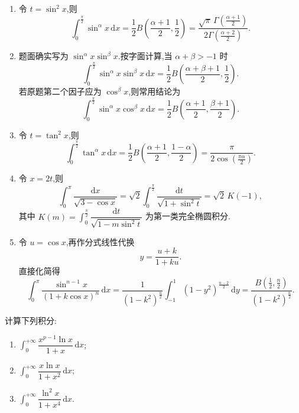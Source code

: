 \begin{solution}
    \begin{enumerate}
        \item 令 $t=\sin^2x$,则
              \[
                  \int_0^{\frac{\pi}{2}}\sin^\alpha x\,\mathrm{d}x
                  =\dfrac{1}{2}B\left(\dfrac{\alpha+1}{2},\dfrac{1}{2}\right)
                  =\dfrac{\sqrt\pi\,\Gamma\left(\frac{\alpha+1}{2}\right)}
                  {2\Gamma\left(\frac{\alpha+2}{2}\right)}.
              \]
        \item 题面确实写为 $\sin^\alpha x\sin^\beta x$.按字面计算,当 $\alpha+\beta>-1$ 时
              \[
                  \int_0^{\frac{\pi}{2}}\sin^\alpha x\sin^\beta x\,\mathrm{d}x
                  =\dfrac{1}{2}B\left(\dfrac{\alpha+\beta+1}{2},\dfrac{1}{2}\right).
              \]
              若原题第二个因子应为 $\cos^\beta x$,则常用结论为
              \[
                  \int_0^{\frac{\pi}{2}}\sin^\alpha x\cos^\beta x\,\mathrm{d}x
                  =\dfrac{1}{2}B\left(\dfrac{\alpha+1}{2},\dfrac{\beta+1}{2}\right).
              \]
        \item 令 $t=\tan^2x$,则
              \[
                  \int_0^{\frac{\pi}{2}}\tan^\alpha x\,\mathrm{d}x
                  =\dfrac{1}{2}B\left(\dfrac{\alpha+1}{2},\dfrac{1-\alpha}{2}\right)
                  =\dfrac{\pi}{2\cos\left(\frac{\pi\alpha}{2}\right)}.
              \]
        \item 令 $x=2t$,则
              \[
                  \int_0^\pi\dfrac{\mathrm{d}x}{\sqrt{3-\cos x}}
                  =\sqrt2\int_0^{\frac{\pi}{2}}\dfrac{\mathrm{d}t}{\sqrt{1+\sin^2t}}
                  =\sqrt2\,K(-1),
              \]
              其中 $\displaystyle K(m)=\int_0^{\frac{\pi}{2}}
                  \dfrac{\mathrm{d}t}{\sqrt{1-m\sin^2t}}$ 为第一类完全椭圆积分.
        \item 令 $u=\cos x$,再作分式线性代换
              \[
                  y=\dfrac{u+k}{1+ku}.
              \]
              直接化简得
              \[
                  \int_0^\pi\dfrac{\sin^{n-1}x}{(1+k\cos x)^n}\,\mathrm{d}x
                  =\dfrac{1}{(1-k^2)^{\frac{n}{2}}}
                  \int_{-1}^1(1-y^2)^{\frac{n-2}{2}}\,\mathrm{d}y
                  =\dfrac{B\left(\frac{1}{2},\frac{n}{2}\right)}{(1-k^2)^{\frac{n}{2}}}.
              \]
    \end{enumerate}
\end{solution}

\begin{example}
    计算下列积分:
    \begin{enumerate}
        \item $\displaystyle\int_0^{+\infty}\dfrac{x^{p-1}\ln x}{1+x}\,\mathrm{d}x$;
        \item $\displaystyle\int_0^{+\infty}\dfrac{x\ln x}{1+x^2}\,\mathrm{d}x$;
        \item $\displaystyle\int_0^{+\infty}\dfrac{\ln^2x}{1+x^4}\,\mathrm{d}x$.
    \end{enumerate}
\end{example}
\exampleblank

